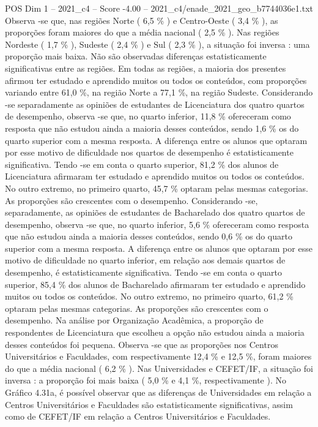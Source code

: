 \begin{textsample}{POS Dim 1 – 2021\_c4 – Score -4.00 – 2021\_c4/enade\_2021\_geo\_b7744036e1.txt}
Observa -se que, nas regiões Norte ( 6,5 \% ) e Centro-Oeste ( 3,4 \% ), as proporções foram maiores do que a média nacional ( 2,5 \% ).
Nas regiões Nordeste ( 1,7 \% ), Sudeste ( 2,4 \% ) e Sul ( 2,3 \% ), a situação foi inversa : uma proporção mais baixa.
Não são observadas diferenças estatisticamente significativas entre as regiões.
Em todas as regiões, a maioria dos presentes afirmou ter estudado e aprendido muitos ou todos os conteúdos, com proporções variando entre 61,0 \%, na região Norte a 77,1 \%, na região Sudeste.
Considerando -se separadamente as opiniões de estudantes de Licenciatura dos quatro quartos de desempenho, observa -se que, no quarto inferior, 11,8 \% ofereceram como resposta que não estudou ainda a maioria desses conteúdos, sendo 1,6 \% os do quarto superior com a mesma resposta.
A diferença entre os alunos que optaram por esse motivo de dificuldade nos quartos de desempenho é estatisticamente significativa.
Tendo -se em conta o quarto superior, 81,2 \% dos alunos de Licenciatura afirmaram ter estudado e aprendido muitos ou todos os conteúdos.
No outro extremo, no primeiro quarto, 45,7 \% optaram pelas mesmas categorias.
As proporções são crescentes com o desempenho.
Considerando -se, separadamente, as opiniões de estudantes de Bacharelado dos quatro quartos de desempenho, observa -se que, no quarto inferior, 5,6 \% ofereceram como resposta que não estudou ainda a maioria desses conteúdos, sendo 0,6 \% os do quarto superior com a mesma resposta.
A diferença entre os alunos que optaram por esse motivo de dificuldade no quarto inferior, em relação aos demais quartos de desempenho, é estatisticamente significativa.
Tendo -se em conta o quarto superior, 85,4 \% dos alunos de Bacharelado afirmaram ter estudado e aprendido muitos ou todos os conteúdos.
No outro extremo, no primeiro quarto, 61,2 \% optaram pelas mesmas categorias.
As proporções são crescentes com o desempenho.
Na análise por Organização Acadêmica, a proporção de respondentes de Licenciatura que escolheu a opção não estudou ainda a maioria desses conteúdos foi pequena.
Observa -se que as proporções nos Centros Universitários e Faculdades, com respectivamente 12,4 \% e 12,5 \%, foram maiores do que a média nacional ( 6,2 \% ).
Nas Universidades e CEFET/IF, a situação foi inversa : a proporção foi mais baixa ( 5,0 \% e 4,1 \%, respectivamente ).
No Gráfico 4.31a, é possível observar que as diferenças de Universidades em relação a Centros Universitários e Faculdades são estatisticamente significativas, assim como de CEFET/IF em relação a Centros Universitários e Faculdades.

\end{textsample}
